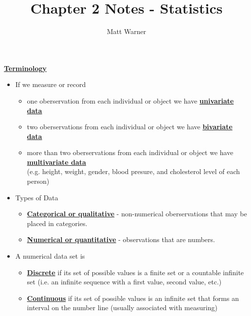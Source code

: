 \documentclass{report}
\title{\Huge{Chapter 2 Notes - Statistics}}
\author{\huge{Matt Warner}}
\date{\huge{}}
\begin{document}
  \maketitle

\bigbreak \noindent \bigbreak \noindent
\begin{large}
  \textbf{\underline{Terminology}} 
\end{large}
\bigbreak \noindent
\begin{itemize}
  \item If we measure or record 
  \begin{itemize}
    \item one oberservation from each individual or object we have \textbf{\underline{univariate data}}
    \item two oberservations from each individual or object we have \textbf{\underline{bivariate data}}
    \item more than two oberservations from each individual or object we have \textbf{\underline{multivariate data}} \\ (e.g. height, weight, gender, blood presure, and cholesterol level of each person)
  \end{itemize}
\item Types of Data
  \begin{itemize}
    \item \textbf{\underline{Categorical or qualitative}} - non-numerical  oberservations that may be placed in categories.
    \item \textbf{\underline{Numerical or quantitative}} - observations that are numbers.
  \end{itemize}
  \item A numerical data set is
    \begin{itemize}
      \item \textbf{\underline{Discrete}} if its set of possible values is a finite set or a countable infinite set (i.e. an infinite sequence with a first value, second value, etc.)
      \item \textbf{\underline{Continuous}} if its set of possible values is an infinite set that forms an interval on the number line (usually associated with measuring)
    \end{itemize}
  \end{itemize}
\end{document}
